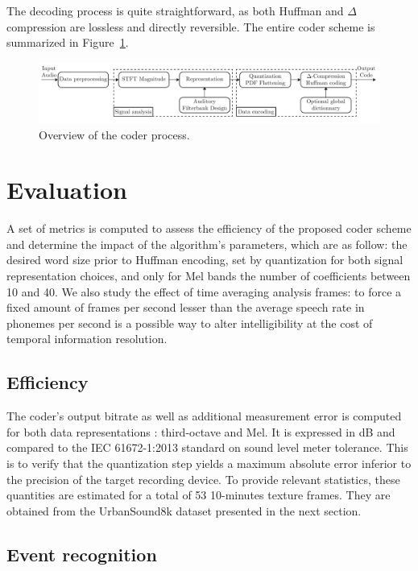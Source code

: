 \documentclass[final,3p,times,twocolumn]{elsarticle}
\begin{document}
The decoding process is quite straightforward, as both Huffman and $\Delta$ compression are lossless and directly reversible. The entire coder scheme is summarized in Figure~\ref{fig:scheme}.

\begin{figure}[htbp]
	\centering
		\includegraphics[width=1\textwidth]{scheme.pdf}
	\caption{Overview of the coder process.}
	\label{fig:scheme}
\end{figure}

\section{Evaluation}
A set of metrics is computed to assess the efficiency of the proposed coder scheme and determine the impact of the algorithm's parameters, which are as follow: the desired word size prior to Huffman encoding, set by quantization for both signal representation choices, and only for Mel bands the number of coefficients between 10 and 40. We also study the effect of time averaging analysis frames: to force a fixed amount of frames per second lesser than the average speech rate in phonemes per second is a possible way to alter intelligibility at the cost of temporal information resolution.

\subsection{Efficiency}

The coder's output bitrate as well as additional measurement error is computed for both data representations : third-octave and Mel. It is expressed in dB and compared to the IEC 61672-1:2013 standard on sound level meter tolerance. This is to verify that the quantization step yields a maximum absolute error inferior to the precision of the target recording device. To provide relevant statistics, these quantities are estimated for a total of 53 10-minutes texture frames. They are obtained from the UrbanSound8k dataset presented in the next section.

\subsection{Event recognition}
\end{document}

